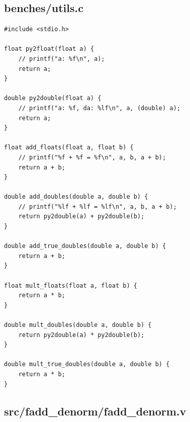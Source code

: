 \documentclass{article}
\begin{document}
\subsection{benches/utils.c}

\begin{lstlisting}
#include <stdio.h>

float py2float(float a) {
    // printf("a: %f\n", a);
    return a;
}

double py2double(float a) {
    // printf("a: %f, da: %lf\n", a, (double) a);
    return a;
}

float add_floats(float a, float b) {
    // printf("%f + %f = %f\n", a, b, a + b);
    return a + b;
}

double add_doubles(double a, double b) {
    // printf("%lf + %lf = %lf\n", a, b, a + b);
    return py2double(a) + py2double(b);
}

double add_true_doubles(double a, double b) {
    return a + b;
}

float mult_floats(float a, float b) {
    return a * b;
}

double mult_doubles(double a, double b) {
    return py2double(a) * py2double(b);
}

double mult_true_doubles(double a, double b) {
    return a * b;
}
\end{lstlisting}

\subsection{src/fadd\_denorm/fadd\_denorm.v}
\end{document}
